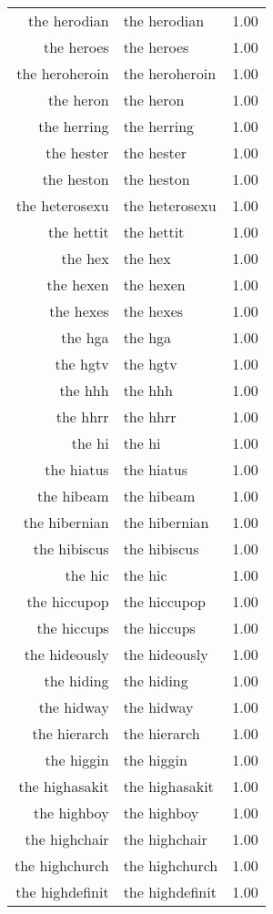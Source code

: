 \begin{table}[ht]
\begin{tabular}{rlr}
  the herodian & the herodian & 1.00 \\ 
  the heroes & the heroes & 1.00 \\ 
  the heroheroin & the heroheroin & 1.00 \\ 
  the heron & the heron & 1.00 \\ 
  the herring & the herring & 1.00 \\ 
  the hester & the hester & 1.00 \\ 
  the heston & the heston & 1.00 \\ 
  the heterosexu & the heterosexu & 1.00 \\ 
  the hettit & the hettit & 1.00 \\ 
  the hex & the hex & 1.00 \\ 
  the hexen & the hexen & 1.00 \\ 
  the hexes & the hexes & 1.00 \\ 
  the hga & the hga & 1.00 \\ 
  the hgtv & the hgtv & 1.00 \\ 
  the hhh & the hhh & 1.00 \\ 
  the hhrr & the hhrr & 1.00 \\ 
  the hi & the hi & 1.00 \\ 
  the hiatus & the hiatus & 1.00 \\ 
  the hibeam & the hibeam & 1.00 \\ 
  the hibernian & the hibernian & 1.00 \\ 
  the hibiscus & the hibiscus & 1.00 \\ 
  the hic & the hic & 1.00 \\ 
  the hiccupop & the hiccupop & 1.00 \\ 
  the hiccups & the hiccups & 1.00 \\ 
  the hideously & the hideously & 1.00 \\ 
  the hiding & the hiding & 1.00 \\ 
  the hidway & the hidway & 1.00 \\ 
  the hierarch & the hierarch & 1.00 \\ 
  the higgin & the higgin & 1.00 \\ 
  the highasakit & the highasakit & 1.00 \\ 
  the highboy & the highboy & 1.00 \\ 
  the highchair & the highchair & 1.00 \\ 
  the highchurch & the highchurch & 1.00 \\ 
  the highdefinit & the highdefinit & 1.00 \\ 

\end{tabular}
\end{table}
